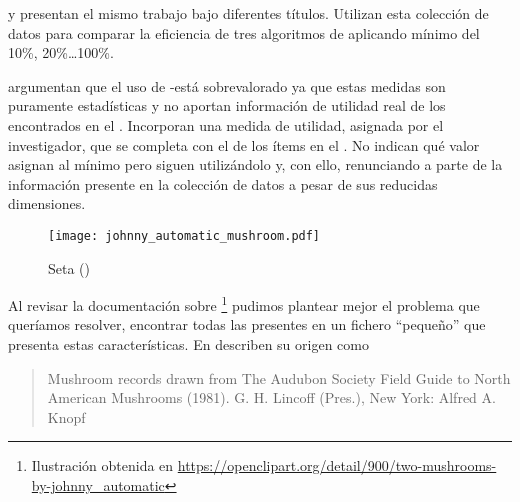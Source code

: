 \citet{MalikRaheja-ImprovingPerformanceOfFrequentItemsetAlgorithm-2013} y \citet{RituArora-IntensificationOfExecutionOfFrequentItemSetAlgorithms-2014} presentan el mismo trabajo bajo diferentes títulos. Utilizan esta colección de datos para comparar la eficiencia de tres algoritmos de \ARM aplicando \soporte mínimo del 10\%, 20\%\ldots 100\%.

\citet{SahooKumarGoswami-AnAlgorithmForMiningHighUtilityClosedItemsetsAndGenerators-2014} argumentan que el uso de \soporte-\confianza está sobrevalorado ya que estas medidas son puramente estadísticas y no aportan información de utilidad real de los \itemsets encontrados en el \dataset. Incorporan una medida de utilidad, asignada por el investigador, que se completa con el \soporte de los ítems en el \dataset. No indican qué valor asignan al \soporte mínimo pero siguen utilizándolo y, con ello, renunciando a parte de la información presente en la colección de datos a pesar de sus reducidas dimensiones.

\begin{wrapfigure}{o}{0.22\textwidth}
  \centering
  \texttt{[image: johnny\_automatic\_mushroom.pdf]}
	\caption{Seta (\mushroom)}
	\label{fig:Seta}
\end{wrapfigure}
Al revisar la documentación sobre \mushroom\footnote{Ilustración obtenida en {\scriptsize\url{https://openclipart.org/detail/900/two-mushrooms-by-johnny_automatic}}} pudimos plantear mejor el problema que queríamos resolver, encontrar todas las \ARs presentes en un fichero "`pequeño"' que presenta estas características. En  describen su origen como

\begin{quote}
   Mushroom records drawn from The Audubon Society Field Guide to North American Mushrooms (1981). G. H. Lincoff (Pres.), New York: Alfred A. Knopf 
\end{quote}


